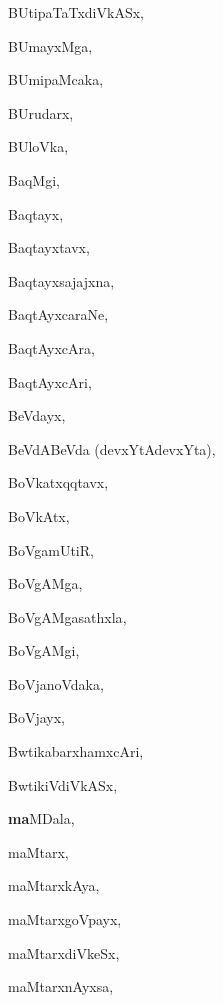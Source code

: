 \begin{multicols}{3}
{\noindent
{BUtipaTaTxdiVkASx}, \pageref{BUtipaTaTxdiVkASx}

\noindent
{BUmayxMga}, \pageref{BUmayxMga}

\noindent
{BUmipaMcaka}, \pageref{BUmipaMcaka}

\noindent
{BUrudarx}, \pageref{BUrudarx}

\noindent
{BUloVka}, \pageref{BUloVka}

\noindent
{BaqMgi}, \pageref{BaqMgi}

\noindent
{Baqtayx}, \pageref{Baqtayx}

\noindent
{Baqtayxtavx}, \pageref{Baqtayxtavx}

\noindent
{Baqtayxsajajxna}, \pageref{Baqtayxsajajxna}

\noindent
{BaqtAyxcaraNe}, \pageref{BaqtAyxcaraNe}

\noindent
{BaqtAyxcAra}, \pageref{BaqtAyxcAra}

\noindent
{BaqtAyxcAri}, \pageref{BaqtAyxcAri}

\noindent
{BeVdayx}, \pageref{BeVdayx}

\noindent
{BeVdABeVda (devxYtAdevxYta)}, \pageref{BeVdABeVdadevxYtAdevxYta}

\noindent
{BoVkatxqqtavx}, \pageref{BoVkatxqqtavx}

\noindent
{BoVkAtx}, \pageref{BoVkAtx}

\noindent
{BoVgamUtiR}, \pageref{BoVgamUtiR}

\noindent
{BoVgAMga}, \pageref{BoVgAMga}

\noindent
{BoVgAMgasathxla}, \pageref{BoVgAMgasathxla}

\noindent
{BoVgAMgi}, \pageref{BoVgAMgi}

\noindent
{BoVjanoVdaka}, \pageref{BoVjanoVdaka}

\noindent
{BoVjayx}, \pageref{BoVjayx}

\noindent
{BwtikabarxhamxcAri}, \pageref{BwtikabarxhamxcAri}

\noindent
{BwtikiVdiVkASx}, \pageref{BwtikiVdiVkASx}

\noindent
{{\large\textbf{ma}}MDala}, \pageref{maMDala}

\noindent
{maMtarx}, \pageref{maMtarx}

\noindent
{maMtarxkAya}, \pageref{maMtarxkAya}

\noindent
{maMtarxgoVpayx}, \pageref{maMtarxgoVpayx}

\noindent
{maMtarxdiVkeSx}, \pageref{maMtarxdiVkeSx}

\noindent
{maMtarxnAyxsa}, \pageref{maMtarxnAyxsa}

}
\end{multicols}
